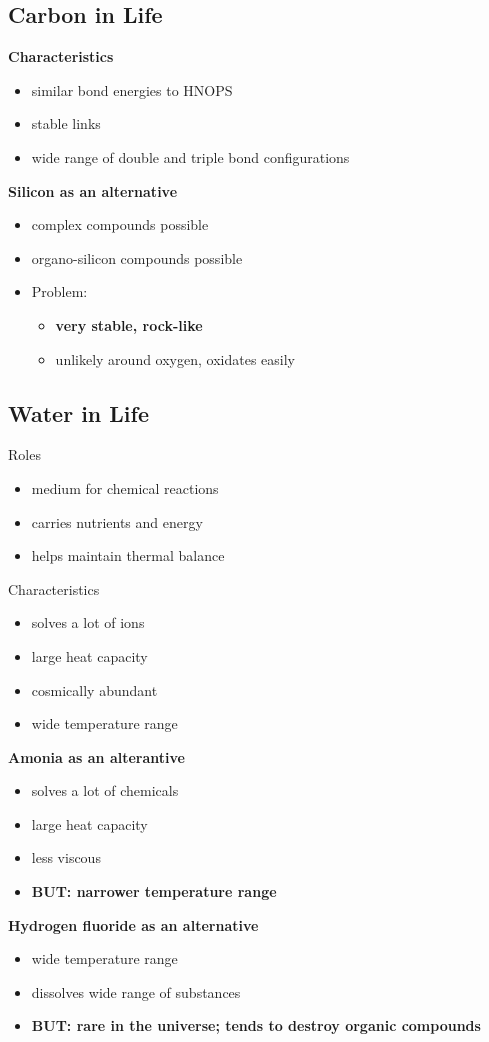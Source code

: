 \documentclass{article}
\theoremstyle{sltheorem}
\begin{document}
\subsection{Carbon in Life}
\textbf{Characteristics}
\begin{itemize}
    \item similar bond energies to HNOPS
    \item stable links
    \item wide range of double and triple bond configurations
\end{itemize}
\textbf{Silicon as an alternative}
\begin{itemize}
    \item complex compounds possible
    \item organo-silicon compounds possible
    \item Problem: 
    \begin{itemize}
        \item \textbf{very stable, rock-like}
        \item unlikely around oxygen, oxidates easily
    \end{itemize}
\end{itemize}
\subsection{Water in Life}
Roles
\begin{itemize}
    \item medium for chemical reactions
    \item carries nutrients and energy
    \item helps maintain thermal balance
\end{itemize}
Characteristics
\begin{itemize}
    \item solves a lot of ions
    \item large heat capacity
    \item cosmically abundant
    \item wide temperature range
\end{itemize}
\textbf{Amonia as an alterantive}

\begin{itemize}
    \item solves a lot of chemicals
    \item large heat capacity
    \item less viscous 
    \item \textbf{BUT: narrower temperature range}
\end{itemize}
\textbf{Hydrogen fluoride as an alternative}
\begin{itemize}
    \item wide temperature range
    \item dissolves wide range of substances
    \item \textbf{BUT: rare in the universe; tends to destroy organic compounds}
\end{itemize}
\end{document}
